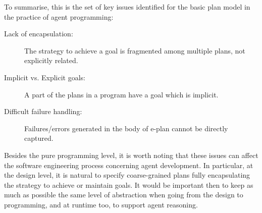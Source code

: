 
\bigskip

To summarise, this is the set of key issues identified for the basic
plan model in the practice of agent programming:
%
\begin{description}
%
\item[Lack of encapsulation:] The strategy to achieve a goal is
  fragmented among multiple plans, not explicitly related.
%
\item[Implicit vs. Explicit goals:] A part of the plans in a program
  have a goal which is implicit.
%
\item[Difficult failure handling:] Failures/errors generated in the
  body of e-plan cannot be directly captured.
%
\end{description}

%

%


\noindent Besides the pure programming level, it is worth noting that these
issues can affect the %
software engineering process concerning
agent development.
In particular, at the design level, it is natural to specify
coarse-grained plans fully encapsulating the strategy to achieve or
maintain goals.
%
It would be important then to keep as much as possible the same level
of abstraction when going from the design to programming, and at
runtime too, to support agent reasoning.


%
%


